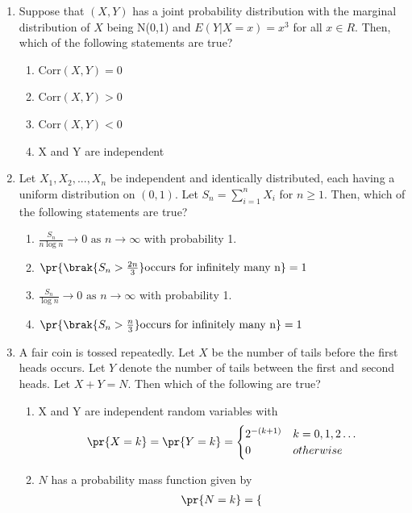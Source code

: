 \begin{enumerate}[label=\thesection.\arabic*.,ref=\thesection.\theenumi]
\item Suppose that $(X,Y)$ has a joint probability distribution with the marginal distribution of $X$ being N(0,1) and $E(Y|X=x)=x^3$ for all $x \in R$. Then, which of the following statements are true?
\begin{enumerate}
    \item Corr$(X,Y) = 0$
    \item Corr$(X,Y) > 0$
    \item Corr$(X,Y) < 0$
    \item X and Y are independent
\end{enumerate}
\solution

%
 \item Let $X_1,X_2,...,X_n$ be independent and identically distributed, each having a uniform distribution on $(0,1)$. Let $S_n=\sum_{i=1}^{n}X_i$ for $n\ge 1$. Then, which of the following statements are true? 
\begin{enumerate}[label=\Alph*)]
\item $\frac{S_n}{n \log{n}}\to 0 \text{ as } n \to \infty$ with probability 1.
\item $\pr{\brak{S_n>\frac{2n}{3}}\text{occurs for infinitely many n}}=1$
\item $\frac{S_n}{\log{n}}\to 0\text{ as } n \to \infty$ with probability 1.
\item $\pr{\brak{S_n>\frac{n}{3}}\text{occurs for infinitely many n}}=1$
\end{enumerate}
%
\solution

%
\item A fair coin is tossed repeatedly. Let $X$ be the number of tails before the first heads occurs. Let $Y$ denote the number of tails between the first and second heads. Let $X+Y = N$. Then which of the following are true?
\begin{enumerate}
    \item X and Y are independent random variables with
    {\footnotesize
    \begin{align}
        \pr{X = k} = \pr{Y = k} =
        \begin{cases}
            2^{-(k+1)} & k=0,1,2 \ldots
            \\
            0 & otherwise
        \end{cases}
    \end{align}
    }
    \item $N$ has a probability mass function given by
    {\small
     \begin{align}
        \pr{N = k} =
        \begin{cases}

\end{cases}
\end{align}}
\end{enumerate}
\end{enumerate}
